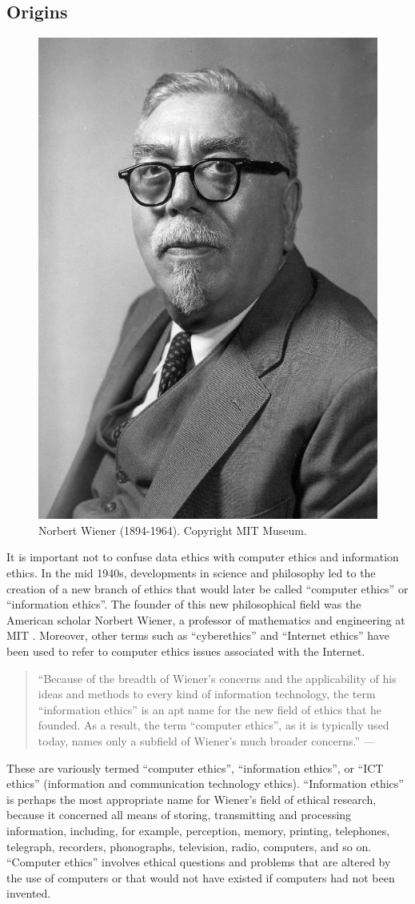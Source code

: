 \documentclass[
]{book}
\begin{document}
\hypertarget{origins}{%
\subsection{Origins}\label{origins}}

\begin{figure}  
 \begin{center}
    \includegraphics[width=.33\textwidth]{Figures/Norbert Wiener.jpeg}  
  \captionsetup{labelformat=empty}
  \caption{Norbert Wiener (1894-1964). Copyright MIT Museum.} 
\end{center}
\end{figure}
\addtocounter{figure}{-1}

It is important not to confuse data ethics with computer ethics and information ethics. In the mid 1940s, developments in science and philosophy led to the creation of a new branch of ethics that would later be called ``computer ethics'' or ``information ethics''. The founder of this new philosophical field was the American scholar Norbert Wiener, a professor of mathematics and engineering at MIT \citep{sep-ethics-computer}. Moreover, other terms such as ``cyberethics'' and ``Internet ethics'' have been used to refer to computer ethics issues associated with the Internet.

\begin{quote}
``Because of the breadth of Wiener's concerns and the applicability of his ideas and methods to every kind of information technology, the term ``information ethics'' is an apt name for the new field of ethics that he founded. As a result, the term ``computer ethics'', as it is typically used today, names only a subfield of Wiener's much broader concerns.'' --- \citep{sep-ethics-computer}
\end{quote}

These are variously termed ``computer ethics'', ``information ethics'', or ``ICT ethics'' (information and communication technology ethics). ``Information ethics'' is
perhaps the most appropriate name for Wiener's field of ethical research, because it concerned all means of storing, transmitting and processing information, including, for example, perception, memory, printing, telephones, telegraph, recorders, phonographs, television, radio, computers, and so on. ``Computer ethics'' involves ethical questions and problems that are altered by the use of computers or that would not have existed if computers had not been invented.
\end{document}
